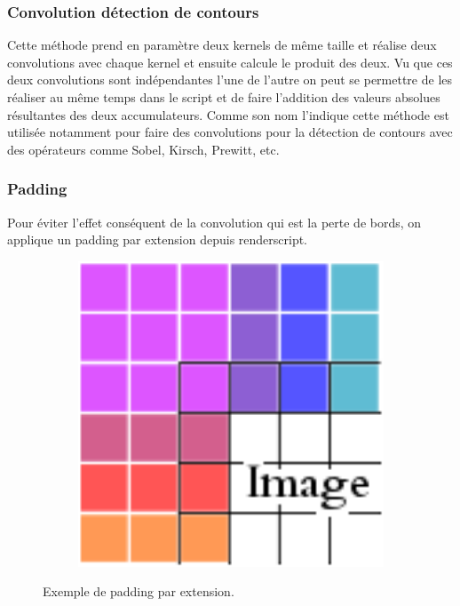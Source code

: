     \subsubsection*{Convolution détection de contours} \label{conv_edges}

        Cette méthode prend en paramètre deux kernels de même taille et réalise deux convolutions avec chaque kernel et ensuite calcule le produit des deux.
        Vu que ces deux convolutions sont indépendantes l'une de l'autre on peut se permettre de les réaliser au même temps dans le script et de faire l'addition
        des valeurs absolues résultantes des deux accumulateurs. Comme son nom l'indique cette méthode est utilisée notamment pour faire des convolutions pour la détection de contours
        avec des opérateurs comme Sobel, Kirsch, Prewitt, etc.
    \\
        

    \subsubsection*{Padding} \label{padding}

        Pour éviter l'effet conséquent de la convolution qui est la perte de bords, on applique un padding par extension depuis renderscript.
        \begin{figure}[!h]
            \centering
            \begin{subfigure}[b]{0.3\textwidth}
                \includegraphics[width=1\textwidth]{report_src/effects/padding.png}
            \end{subfigure}
            \caption*{Exemple de padding par extension.}
        \end{figure} 


